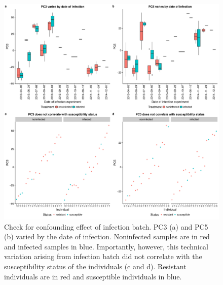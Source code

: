\documentclass[fleqn,10pt]{wlscirep}
\begin{document}
\begin{figure}[ht]
\centering
\includegraphics[width=\linewidth]{../figure/batch-infection.pdf}
\caption{
Check for confounding effect of infection batch. PC3 (a) and PC5 (b)
varied by the date of infection. Noninfected samples are in red and
infected samples in blue. Importantly, however, this technical
variation arising from infection batch did not correlate with the
susceptibility status of the individuals (c and d). Resistant
individuals are in red and susceptible individuals in blue.
}
\label{fig:infection}
\end{figure}
\end{document}
